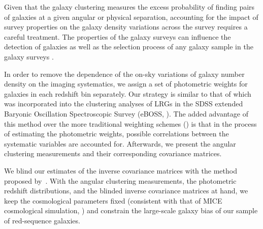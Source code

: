 \documentclass{aa}
\numberwithin{equation}{section}
\begin{document}
Given that the galaxy clustering measures the excess probability of finding pairs of galaxies at a given angular or physical separation, accounting for the impact of survey properties on the galaxy density variations across the survey requires a careful treatment. The properties of the galaxy surveys can influence the detection of galaxies as well as the selection process of any galaxy sample in the galaxy surveys \citep[e.g.][]{alam2017,kwan2017,ross2017,elvin2017,crocce2019,kalus2019}. 


In order to remove the dependence of the on-sky variations of galaxy number density on the imaging systematics, we assign a set of photometric weights for galaxies in each redshift bin separately. Our strategy is similar to that of \citet{bautista2018sdss, icaza2020clustering} which was incorporated into the clustering analyses of LRGs in the SDSS extended Baryonic Oscillation Spectroscopic Survey (eBOSS, \citealt{dawson2016}). The added advantage of this method over the more traditional weighting schemes (\citealt{ross2017clustering, crocce2019dark}) is that in the process of estimating the photometric weights, possible correlations between the systematic variables are accounted for. Afterwards, we present the angular clustering measurements and their corresponding covariance matrices.

We blind our estimates of the inverse covariance matrices with the method proposed by~\citet{sellentin2019}. With the angular clustering measurements, the photometric redshift distributions, and the blinded inverse covariance matrices at hand, we keep the cosmological parameters fixed (consistent with that of MICE cosmological simulation, \citet{MICE1}) and constrain the large-scale galaxy bias of our sample of red-sequence galaxies. 

\end{document}
